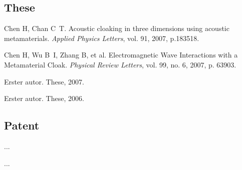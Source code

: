 \begin{achievements}

  \subsection*{These}

  \begin{bibliolist}{}
    \item Chen H, Chan C~T. Acoustic cloaking in three dimensions using acoustic metamaterials. \textit{Applied Physics Letters}, vol. 91, 2007, p.183518.
    \item Chen H, Wu B~I, Zhang B, et al. Electromagnetic Wave Interactions with a Metamaterial Cloak. \textit{Physical Review Letters}, vol. 99, no. 6, 2007, p. 63903.
  \end{bibliolist}

  \begin{bibliolist*}{}
    \item Erster autor. These, 2007.
    \item Erster autor. These, 2006.
  \end{bibliolist*}

  \subsection*{Patent}

  \begin{bibliolist}{}
    \item ...
  \end{bibliolist}

  \begin{bibliolist*}{}
    \item ...
  \end{bibliolist*}

\end{achievements}
